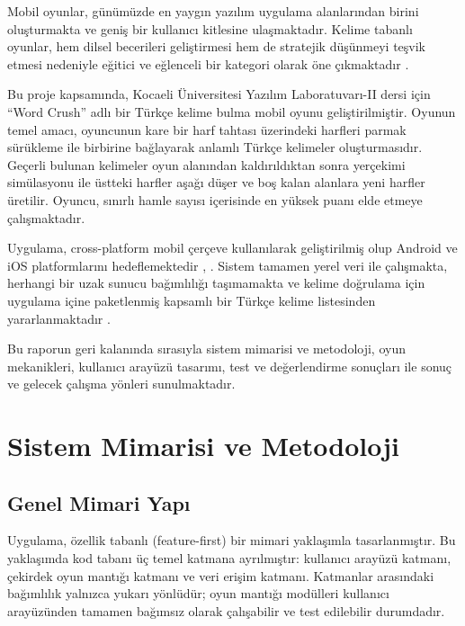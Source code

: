 \documentclass[conference]{IEEEtran}
\begin{document}
Mobil oyunlar, günümüzde en yaygın yazılım uygulama alanlarından birini oluşturmakta ve geniş bir kullanıcı kitlesine ulaşmaktadır. Kelime tabanlı oyunlar, hem dilsel becerileri geliştirmesi hem de stratejik düşünmeyi teşvik etmesi nedeniyle eğitici ve eğlenceli bir kategori olarak öne çıkmaktadır \cite{cormen_algorithms}.

Bu proje kapsamında, Kocaeli Üniversitesi Yazılım Laboratuvarı-II dersi için ``Word Crush'' adlı bir Türkçe kelime bulma mobil oyunu geliştirilmiştir. Oyunun temel amacı, oyuncunun kare bir harf tahtası üzerindeki harfleri parmak sürükleme ile birbirine bağlayarak anlamlı Türkçe kelimeler oluşturmasıdır. Geçerli bulunan kelimeler oyun alanından kaldırıldıktan sonra yerçekimi simülasyonu ile üstteki harfler aşağı düşer ve boş kalan alanlara yeni harfler üretilir. Oyuncu, sınırlı hamle sayısı içerisinde en yüksek puanı elde etmeye çalışmaktadır.

Uygulama, cross-platform mobil çerçeve kullanılarak geliştirilmiş olup Android ve iOS platformlarını hedeflemektedir \cite{flutter_overview}, \cite{dart_language}. Sistem tamamen yerel veri ile çalışmakta, herhangi bir uzak sunucu bağımlılığı taşımamakta ve kelime doğrulama için uygulama içine paketlenmiş kapsamlı bir Türkçe kelime listesinden yararlanmaktadır \cite{turkish_word_list}.

Bu raporun geri kalanında sırasıyla sistem mimarisi ve metodoloji, oyun mekanikleri, kullanıcı arayüzü tasarımı, test ve değerlendirme sonuçları ile sonuç ve gelecek çalışma yönleri sunulmaktadır.

\section{Sistem Mimarisi ve Metodoloji}

\subsection{Genel Mimari Yapı}

Uygulama, özellik tabanlı (feature-first) bir mimari yaklaşımla tasarlanmıştır. Bu yaklaşımda kod tabanı üç temel katmana ayrılmıştır: kullanıcı arayüzü katmanı, çekirdek oyun mantığı katmanı ve veri erişim katmanı. Katmanlar arasındaki bağımlılık yalnızca yukarı yönlüdür; oyun mantığı modülleri kullanıcı arayüzünden tamamen bağımsız olarak çalışabilir ve test edilebilir durumdadır.
\end{document}
